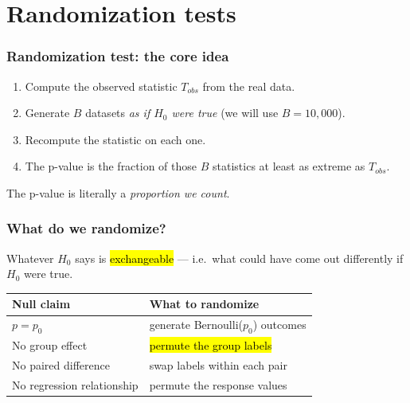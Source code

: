 \documentclass[slidestop,compress,mathserif]{beamer}
\begin{document}
\section{Randomization tests}
\begin{frame}
\frametitle{Randomization test: the core idea}


\begin{enumerate}
\item Compute the observed statistic $T_{obs}$ from the real data.
\item Generate $B$ datasets \emph{as if $H_0$ were true} (we will use $B=10{,}000$).
\item Recompute the statistic on each one.
\item The p-value is the fraction of those $B$ statistics at least as extreme as $T_{obs}$.
\end{enumerate}

\vspace{0.3em}
The p-value is literally a \emph{proportion we count}.

\end{frame}
\begin{frame}
\frametitle{What do we randomize?}

Whatever $H_0$ says is \hl{exchangeable} --- i.e.\ what could have come out differently if $H_0$ were true.

\begin{center}
{\small
\begin{tabular}{ll}
\toprule
Null claim & What to randomize \\
\midrule
$p = p_0$ & generate Bernoulli($p_0$) outcomes \\
No group effect & \hl{permute the group labels} \\
No paired difference & swap labels within each pair \\
No regression relationship & permute the response values \\
\bottomrule
\end{tabular}}
\end{center}

\vspace{-0.1em}

\end{frame}
\end{document}
